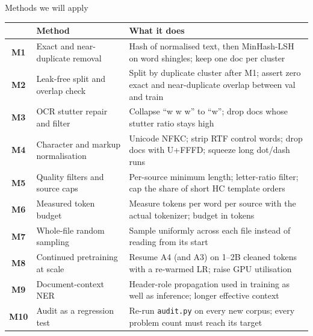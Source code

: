 \documentclass[aspectratio=169,11pt]{beamer}
\newcommand{\code}[1]{\texttt{\small #1}}
\newcommand{\mt}[1]{\textbf{\textcolor{aqua!80!black}{#1}}} %
\begin{document}
\begin{frame}{Methods we will apply}
  \scriptsize\renewcommand{\arraystretch}{0.95}
  \begin{tabularx}{\textwidth}{clX}
    \toprule
    & Method & What it does \\
    \midrule
    \mt{M1} & Exact and near-duplicate removal & Hash of normalised text, then MinHash-LSH on word shingles; keep one doc per cluster \\
    \mt{M2} & Leak-free split and overlap check & Split by duplicate cluster after M1; assert zero exact and near-duplicate overlap between val and train \\
    \mt{M3} & OCR stutter repair and filter & Collapse ``w w w'' to ``w''; drop docs whose stutter ratio stays high \\
    \mt{M4} & Character and markup normalisation & Unicode NFKC; strip RTF control words; drop docs with U+FFFD; squeeze long dot/dash runs \\
    \mt{M5} & Quality filters and source caps & Per-source minimum length; letter-ratio filter; cap the share of short HC template orders \\
    \mt{M6} & Measured token budget & Measure tokens per word per source with the actual tokenizer; budget in tokens \\
    \mt{M7} & Whole-file random sampling & Sample uniformly across each file instead of reading from its start \\
    \mt{M8} & Continued pretraining at scale & Resume A4 (and A3) on 1--2B cleaned tokens with a re-warmed LR; raise GPU utilisation \\
    \mt{M9} & Document-context NER & Header-role propagation used in training as well as inference; longer effective context \\
    \mt{M10} & Audit as a regression test & Re-run \code{audit.py} on every new corpus; every problem count must reach its target \\
    \bottomrule
  \end{tabularx}
\end{frame}
\end{document}

